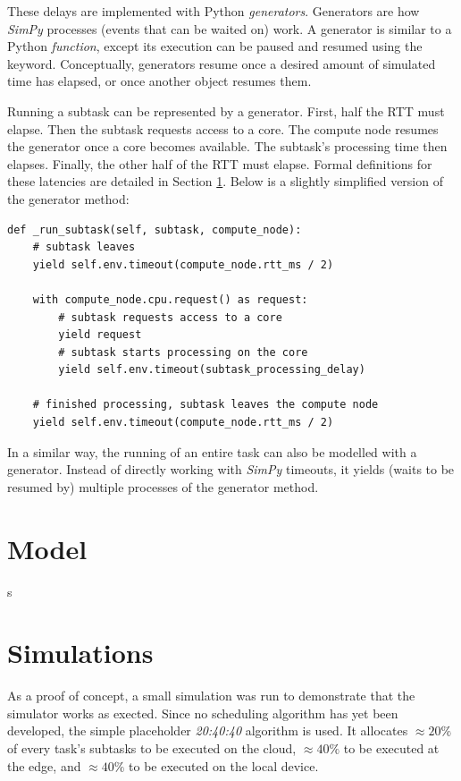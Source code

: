 \documentclass[]{UCD_CS_Interim_Report}
\begin{document}
These delays are implemented with Python \textit{generators}. Generators are how \textit{SimPy} processes (events that can be waited on) work. A generator is similar to a Python \textit{function}, except its execution can be paused and resumed using the  keyword. Conceptually, generators resume once a desired amount of simulated time has elapsed, or once another object resumes them.

Running a subtask can be represented by a generator. First, half the RTT must elapse. Then the subtask requests access to a core. The compute node resumes the generator once a core becomes available. The subtask's processing time then elapses. Finally, the other half of the RTT must elapse. Formal definitions for these latencies are detailed in Section \ref{model}. Below is a slightly simplified version of the  generator method:

\begin{verbatim}
def _run_subtask(self, subtask, compute_node):
    # subtask leaves
    yield self.env.timeout(compute_node.rtt_ms / 2)

    with compute_node.cpu.request() as request:
        # subtask requests access to a core
        yield request
        # subtask starts processing on the core
        yield self.env.timeout(subtask_processing_delay)
    
    # finished processing, subtask leaves the compute node
    yield self.env.timeout(compute_node.rtt_ms / 2)
\end{verbatim}

In a similar way, the running of an entire task can also be modelled with a generator. Instead of directly working with \textit{SimPy} timeouts, it yields (waits to be resumed by) multiple processes of the  generator method.

\section{Model} \label{model}
s

\section{Simulations} \label{sims}
As a proof of concept, a small simulation was run to demonstrate that the simulator works as exected. Since no scheduling algorithm has yet been developed, the simple placeholder \textit{20:40:40} algorithm is used. It allocates $\approx20\%$ of every task's subtasks to be executed on the cloud, $\approx40\%$ to be executed at the edge, and $\approx40\%$ to be executed on the local device.
\end{document}
